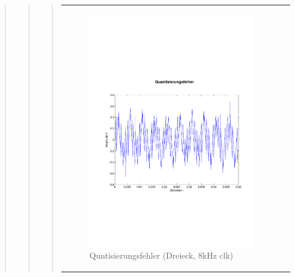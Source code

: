 \begin{quote}
\begin{quote}
\begin{quote}
            \begin{center}
                \begin{tabular}{ll}
                
                \hspace{-4cm}
                    
                    \begin{minipage}{0.55\textwidth}
                        \begin{figure}[H]
                            \includegraphics[scale=0.4, trim = 0cm 7cm 0cm
                            7.5cm, clip]
                            {./Bilder/drei8_Quantisierungsfehler}
                              \caption{Quntisierungsfehler (Dreieck, 8kHz clk)}
                        \end{figure}
                    \end{minipage}
                                  

\end{tabular}
\end{center}
\end{quote}
\end{quote}
\end{quote}
